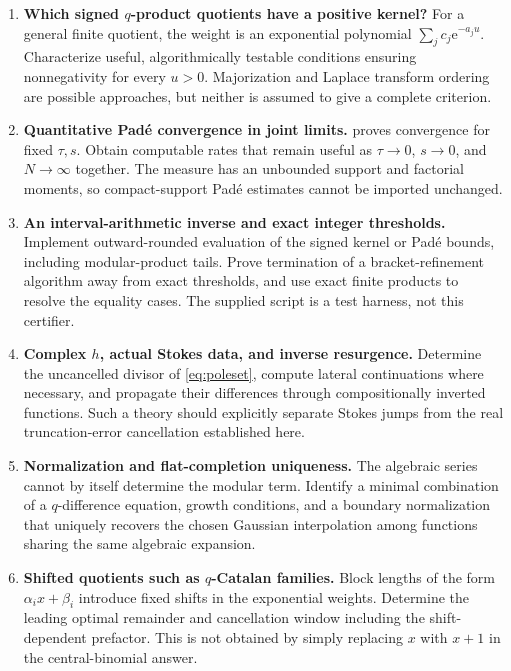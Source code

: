 \documentclass[11pt,a4paper]{article}
\newcommand{\ee}{\mathrm e}
\numberwithin{equation}{section}
\theoremstyle{plain}
\theoremstyle{definition}
\theoremstyle{remark}
\begin{document}
\begin{enumerate}[label=\textbf{Q\arabic*.},leftmargin=13mm]
\item \textbf{Which signed $q$-product quotients have a positive kernel?}
For a general finite quotient, the weight is an exponential polynomial
$\sum_jc_j\ee^{-a_j u}$. Characterize useful, algorithmically testable
conditions ensuring nonnegativity for every $u>0$. Majorization and Laplace
transform ordering are possible approaches, but neither is assumed to give
a complete criterion.

\item \textbf{Quantitative Pad\'e convergence in joint limits.}
 proves convergence for fixed $\tau,s$. Obtain computable
rates that remain useful as $\tau\to0$, $s\to0$, and $N\to\infty$ together.
The measure has an unbounded support and factorial moments, so compact-support
Pad\'e estimates cannot be imported unchanged.

\item \textbf{An interval-arithmetic inverse and exact integer thresholds.}
Implement outward-rounded evaluation of the signed kernel or Pad\'e bounds,
including modular-product tails. Prove termination of a bracket-refinement
algorithm away from exact thresholds, and use exact finite products to
resolve the equality cases. The supplied script is a test harness, not this
certifier.

\item \textbf{Complex $h$, actual Stokes data, and inverse resurgence.}
Determine the uncancelled divisor of \eqref{eq:poleset}, compute lateral
continuations where necessary, and propagate their differences through
compositionally inverted functions. Such a theory should explicitly
separate Stokes jumps from the real truncation-error cancellation established
here.

\item \textbf{Normalization and flat-completion uniqueness.}
The algebraic series cannot by itself determine the modular term.
Identify a minimal combination of a $q$-difference equation, growth
conditions, and a boundary normalization that uniquely recovers the chosen
Gaussian interpolation among functions sharing the same algebraic expansion.

\item \textbf{Shifted quotients such as $q$-Catalan families.}
Block lengths of the form $\alpha_i x+\beta_i$ introduce fixed shifts in the
exponential weights. Determine the leading optimal remainder and cancellation
window including the shift-dependent prefactor. This is not obtained by
simply replacing $x$ with $x+1$ in the central-binomial answer.


\end{enumerate}
\end{document}
